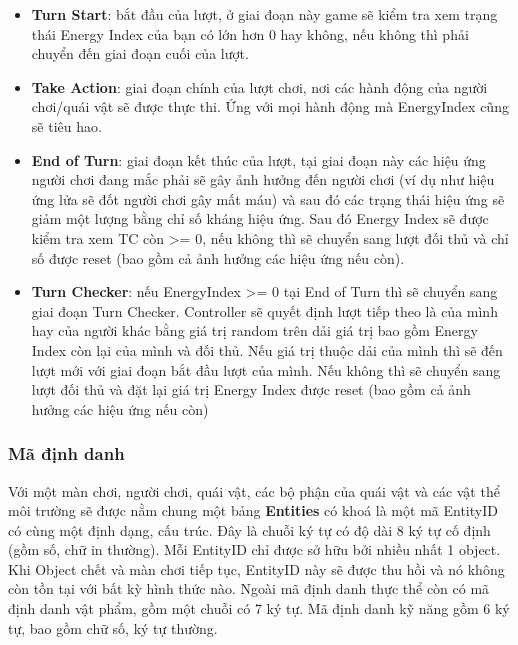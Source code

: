 \begin{itemize}
	\item \textbf{Turn Start}: bắt đầu của lượt, ở giai đoạn này game sẽ kiểm tra xem trạng thái Energy Index của bạn có lớn hơn 0 hay không, nếu không thì phải chuyển đến giai đoạn cuối của lượt.
	\item \textbf{Take Action}: giai đoạn chính của lượt chơi, nơi các hành động của người chơi/quái vật sẽ được thực thi. Ứng với mọi hành động mà EnergyIndex cũng sẽ tiêu hao.
	\item \textbf{End of Turn}: giai đoạn kết thúc của lượt, tại giai đoạn này các hiệu ứng người chơi đang mắc phải sẽ gây ảnh hưởng đến người chơi (ví dụ như hiệu ứng lửa sẽ đốt người chơi gây mất máu) và sau đó các trạng thái hiệu ứng sẽ giảm một lượng bằng chỉ số kháng hiệu ứng. Sau đó Energy Index sẽ được kiểm tra xem TC còn >= 0, nếu không thì sẽ chuyển sang lượt đối thủ và chỉ số được reset (bao gồm cả ảnh hưởng các hiệu ứng nếu còn).
	\item \textbf{Turn Checker}: nếu EnergyIndex >= 0 tại End of Turn thì sẽ chuyển sang giai đoạn Turn Checker. Controller sẽ quyết định lượt tiếp theo là của mình hay của người khác bằng giá trị random trên dải giá trị bao gồm Energy Index còn lại của mình và đối thủ. Nếu giá trị thuộc dải của mình thì sẽ đến lượt mới với giai đoạn bắt đầu lượt của mình. Nếu không thì sẽ chuyển sang lượt đối thủ và đặt lại giá trị Energy Index được reset (bao gồm cả ảnh hưởng các hiệu ứng nếu còn) 
\end{itemize}
\subsubsection{Mã định danh}
\hspace*{0.5cm} Với một màn chơi, người chơi, quái vật, các bộ phận của quái vật và các vật thể môi trường sẽ được nằm chung một bảng \textbf{Entities} có khoá là một mã EntityID có cùng một định dạng, cấu trúc. Đây là chuỗi ký tự có độ dài 8 ký tự cố định (gồm số, chữ in thường). Mỗi EntityID chỉ được sở hữu bởi nhiều nhất 1 object. Khi Object chết và màn chơi tiếp tục, EntityID này sẽ được thu hồi và nó không còn tồn tại với bất kỳ hình thức nào.
\hspace*{0.5cm} Ngoài mã định danh thực thể còn có mã định danh vật phẩm, gồm một chuỗi có 7 ký tự. Mã định danh kỹ năng gồm 6 ký tự, bao gồm chữ số, ký tự thường.
